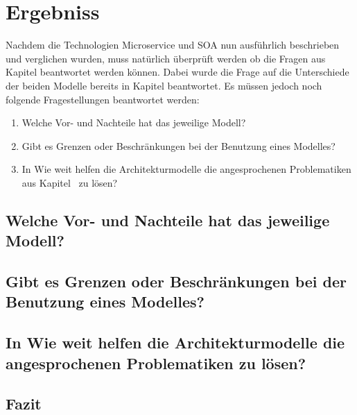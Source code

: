 \chapter{Ergebniss}
\label{chap:Ergebniss}
Nachdem die Technologien Microservice und SOA nun ausführlich beschrieben und verglichen wurden, muss natürlich überprüft werden ob die Fragen aus Kapitel  beantwortet werden können. Dabei wurde die Frage auf die Unterschiede der beiden Modelle bereits in Kapitel  beantwortet. Es müssen jedoch noch folgende Fragestellungen beantwortet werden:

\begin{enumerate}
    \item Welche Vor- und Nachteile hat das jeweilige Modell?
    \item Gibt es Grenzen oder Beschränkungen bei der Benutzung eines Modelles?
    \item In Wie weit helfen die Architekturmodelle die angesprochenen Problematiken aus Kapitel \ zu lösen?
\end{enumerate}

\section{Welche Vor- und Nachteile hat das jeweilige Modell?}
\label{sec:VorNachteile}


\section{Gibt es Grenzen oder Beschränkungen bei der Benutzung eines Modelles?}
\label{sec:Beschraenkungen}

\section{In Wie weit helfen die Architekturmodelle die angesprochenen Problematiken zu lösen?}
\label{sec:LoesungDerProblematiken}



\section{Fazit}
\label{sec:Fazit}
